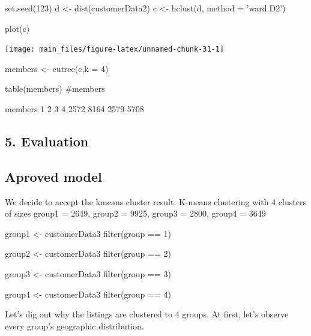 \begin{Schunk}
\begin{Sinput}
set.seed(123)
d <- dist(customerData2)
c <- hclust(d, method = 'ward.D2')

plot(c)
\end{Sinput}


\begin{center}\texttt{[image: main\_files/figure-latex/unnamed-chunk-31-1]} \end{center}

\end{Schunk}

\begin{Schunk}
\begin{Sinput}
members <- cutree(c,k = 4)

table(members)
#members
\end{Sinput}
\begin{Soutput}
members
   1    2    3    4 
2572 8164 2579 5708 
\end{Soutput}
\end{Schunk}

\hypertarget{evaluation-1}{%
\subsection{5. Evaluation}\label{evaluation-1}}

\hypertarget{aproved-model-1}{%
\subsection{Aproved model}\label{aproved-model-1}}

We decide to accept the kmeans cluster result. K-means clustering with 4
clusters of sizes group1 = 2649, group2 = 9925, group3 = 2800, group4 =
3649

\begin{Schunk}
\begin{Sinput}
group1 <- customerData3 %
  filter(group == 1)

group2 <- customerData3 %
  filter(group == 2)

group3 <- customerData3 %
  filter(group == 3)

group4 <- customerData3 %
  filter(group == 4)
\end{Sinput}
\end{Schunk}

Let's dig out why the listings are clustered to 4 groups. At first,
let's observe every group's geographic distribution.

